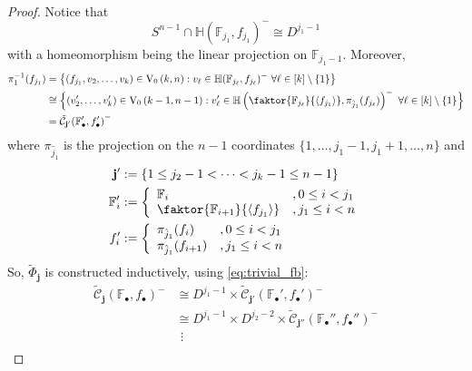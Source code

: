 \begin{proof}
Notice that
\begin{equation}\label{eq:linear_proj_disc}
S^{n-1}\cap\mathbb{H}{\left(\mathbb{F}_{j_1},f_{j_1}\right)}^-\cong D^{j_1-1}
\end{equation}
with a homeomorphism being the linear projection on $\mathbb{F}_{j_1-1}$. Moreover,
\begin{align}
\begin{split}
\pi_1^{-1}(f_{j_1})&=\big\{(f_{j_1},v_2,\ldots,v_k)\in\StO{k}{n}:v_{\ell}\in\mathbb{H}(\mathbb{F}_{j_{\ell}},f_{j_{\ell}})^-\ \forall\ell\in[k]\setminus\{1\}\big\}\\
&\cong\Big\{(v'_2,\ldots,v'_k)\in\StO{k-1}{n-1}
:v'_{\ell}\in\mathbb{H}\left(\faktor{\mathbb{F}_{j_{\ell}}}{\left<f_{j_1}\right>},\pi_{\hat{j}_1}(f_{j_{\ell}})\right)^-\ \forall\ell\in[k]\setminus\{1\}\Big\}\\
&=\tilde{\mathcal{C}}_{\mathbf{j}'}{\left(\mathbb{F}'_{\bullet},f'_{\bullet}\right)}^-
\end{split}\label{eq:induction_step}
\end{align}
where $\pi_{\hat{j}_1}$ is the projection on the $n-1$ coordinates $\{1,\ldots,j_1-1,j_1+1,\ldots,n\}$ and
\begin{align*}
\mathbf{j}'&:=\{1\leq j_2-1<\cdots<j_k-1\leq n-1\}\\
\mathbb{F}'_i&:=\left\{\begin{array}{ll}\mathbb{F}_i&,0\leq i<j_1\\\faktor{\mathbb{F}_{i+1}}{\left<f_{j_1}\right>}&,j_1\leq i<n\end{array}\right.\\
f'_i&:=\left\{\begin{array}{ll}\pi_{\hat{j}_1}(f_i)&,0\leq i<j_1\\\pi_{\hat{j}_1}(f_{i+1})&,j_1\leq i<n\end{array}\right.
\end{align*}
So, $\tilde{\Phi}_{\mathbf{j}}$ is constructed inductively, using \eqref{eq:trivial_fb}:
\begin{align*}
\tilde{\mathcal{C}}_{\mathbf{j}}{\left(\mathbb{F}_{\bullet},f_{\bullet}\right)}^-&\cong D^{j_1-1}\times\tilde{\mathcal{C}}_{\mathbf{j}'}{\left(\mathbb{F}_{\bullet}',f_{\bullet}'\right)}^-\\
&\cong D^{j_1-1}\times D^{j_2-2}\times \tilde{\mathcal{C}}_{\mathbf{j}''}{\left(\mathbb{F}_{\bullet}'',f_{\bullet}''\right)}^-\\
&\ \,\vdots\\

\end{align*}
\end{proof}
